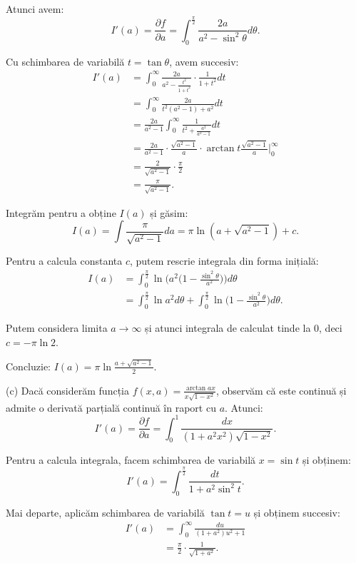 \documentclass[11pt,a4paper]{article}
\newcommand\ds{\displaystyle}
\theoremstyle{dotless}
\theoremstyle{dotlessdr}
\begin{document}
Atunci avem:
\[
  I'(a) = \frac{\partial f}{\partial a} = \ds\int_0^{\frac{\pi}{2}} \frac{2a}{a^2 - \sin^2 \theta} d\theta.
\]

Cu schimbarea de variabilă $t = \tan \theta $, avem succesiv:
\begin{align*}
  I'(a) &= \int_0^\infty \frac{2a}{a^2 - \frac{t^2}{1 + t^2}} \cdot \frac{1}{1 + t^2} dt \\
        &= \int_0^\infty \frac{2a}{t^2(a^2 - 1) + a^2} dt \\
        &= \frac{2a}{a^2 - 1} \int_0^\infty \frac{1}{t^2 + \frac{a^2}{a^2 - 1}} dt \\
        &= \frac{2a}{a^2 - 1} \cdot \frac{\sqrt{a^2 - 1}}{a} \cdot \arctan t \frac{\sqrt{a^2 - 1}}{a} \Big|_0^\infty \\
        &= \frac{2}{\sqrt{a^2 - 1}} \cdot \frac{\pi}{2} \\
        &= \frac{\pi}{\sqrt{a^2 - 1}}.
\end{align*}

Integrăm pentru a obține $I(a)$ și găsim:
\[
  I(a) = \int \frac{\pi}{\sqrt{a^2 - 1}} da = \pi \ln(a + \sqrt{a^2 - 1}) + c.
\]

Pentru a calcula constanta $c$, putem rescrie integrala din forma inițială:
\begin{align*}
  I(a) &= \int_0^{\frac{\pi}{2}} \ln\Big( a^2\Big(1 - \frac{\sin^2 \theta}{a^2}\Big) \Big) d\theta \\
       &= \int_0^{\frac{\pi}{2}} \ln a^2 d\theta + \int_0^{\frac{\pi}{2}} \ln \Big(1 - \frac{\sin^2 \theta}{a^2} \Big) d\theta.
\end{align*}

Putem considera limita $ a \to \infty $ și atunci integrala de calculat tinde la 0, deci $ c = -\pi \ln 2 $.

Concluzie: $ I(a) = \pi \ln \frac{a + \sqrt{a^2 - 1}}{2} $.

\vspace{1cm}

(c) Dacă considerăm funcția $ f(x, a) = \frac{\arctan ax}{x \sqrt{1 - x^2}}$, observăm că este continuă
și admite o derivată parțială continuă în raport cu $ a $. Atunci:
\[
  I'(a) = \frac{\partial f}{\partial a} = \int_0^1 \frac{dx}{(1 + a^2 x^2) \sqrt{1 - x^2}}.
\]

Pentru a calcula integrala, facem schimbarea de variabilă $ x = \sin t $ și obținem:
\[
  I'(a) = \int_0^{\frac{\pi}{2}} \frac{dt}{1 + a^2 \sin^2 t}.
\]

Mai departe, aplicăm schimbarea de variabilă $ \tan t = u $ și obținem succesiv:
\begin{align*}
  I'(a) &= \int_0^\infty \frac{du}{(1 + a^2)u^2 + 1} \\
        &= \frac{\pi}{2} \cdot \frac{1}{\sqrt{1 + a^2}}.
\end{align*}
\end{document}
